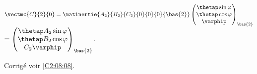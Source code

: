 $\vectmc{C}{2}{0} = \matinertie{A_2}{B_2}{C_2}{0}{0}{0}{\bas{2}} 
 \begin{pmatrix} 
 \thetap \sin\varphi  \\
  \thetap \cos\varphi  \\
  \varphip
 \end{pmatrix}_{\bas{2}}$
 $ =  \begin{pmatrix} 
 \thetap A_2 \sin\varphi  \\
  \thetap B_2 \cos\varphi  \\
  C_ 2 \varphip
 \end{pmatrix}_{\bas{2}}$.
%  
%  


\else
\fi

\ifprof
\else
\fi


\ifcolle
{}
\else
\fi


\ifprof
\else
\begin{flushright}
\footnotesize{Corrigé  voir \ref{C2:08:08}.}
\end{flushright}%
\fi